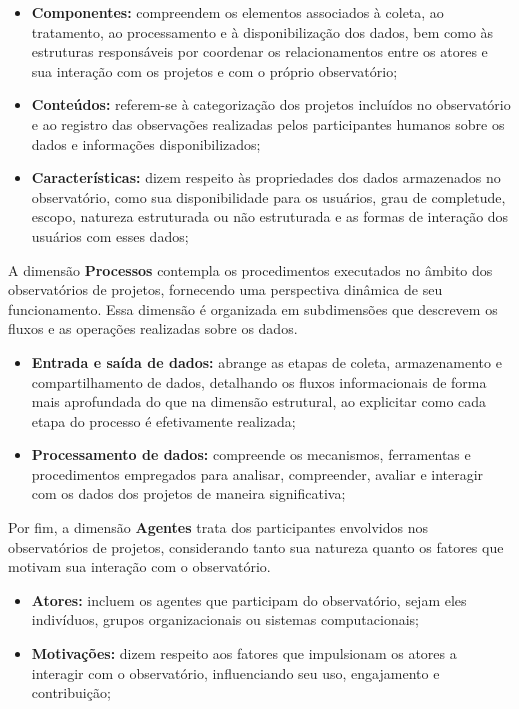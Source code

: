 \begin{itemize}
    \item \textbf{Componentes:} compreendem os elementos associados à coleta, ao tratamento, ao processamento e à disponibilização dos dados, bem como às estruturas responsáveis por coordenar os relacionamentos entre os atores e sua interação com os projetos e com o próprio observatório;
    \item \textbf{Conteúdos:} referem-se à categorização dos projetos incluídos no observatório e ao registro das observações realizadas pelos participantes humanos sobre os dados e informações disponibilizados;
    \item \textbf{Características:} dizem respeito às propriedades dos dados armazenados no observatório, como sua disponibilidade para os usuários, grau de completude, escopo, natureza estruturada ou não estruturada e as formas de interação dos usuários com esses dados;
\end{itemize}

A dimensão \textbf{Processos} contempla os procedimentos executados no âmbito dos observatórios de projetos, fornecendo uma perspectiva dinâmica de seu funcionamento. Essa dimensão é organizada em subdimensões que descrevem os fluxos e as operações realizadas sobre os dados.

\begin{itemize}
    \item \textbf{Entrada e saída de dados:} abrange as etapas de coleta, armazenamento e compartilhamento de dados, detalhando os fluxos informacionais de forma mais aprofundada do que na dimensão estrutural, ao explicitar como cada etapa do processo é efetivamente realizada;
    \item \textbf{Processamento de dados:} compreende os mecanismos, ferramentas e procedimentos empregados para analisar, compreender, avaliar e interagir com os dados dos projetos de maneira significativa;
\end{itemize}

Por fim, a dimensão \textbf{Agentes} trata dos participantes envolvidos nos observatórios de projetos, considerando tanto sua natureza quanto os fatores que motivam sua interação com o observatório.

\begin{itemize}
    \item \textbf{Atores:} incluem os agentes que participam do observatório, sejam eles indivíduos, grupos organizacionais ou sistemas computacionais;
    \item \textbf{Motivações:} dizem respeito aos fatores que impulsionam os atores a interagir com o observatório, influenciando seu uso, engajamento e contribuição;
\end{itemize}


